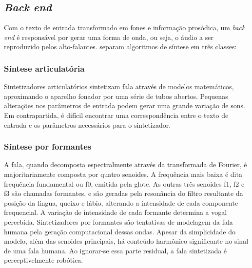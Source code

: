 
\subsection{\emph{Back end}}
\label{backend}
Com o texto de entrada transformado em fones e informação prosódica, um
\emph{back end} é responsável por gerar uma forma de onda, ou seja, o áudio a
ser reproduzido pelos alto-falantes.  separam
algoritmos de síntese em três classes:

\subsubsection{Síntese articulatória}
Sintetizadores articulatórios sintetizam fala através de modelos matemáticos,
aproximando o aparelho fonador por uma série de tubos abertos. Pequenas
alterações nos parâmetros de entrada podem gerar uma grande variação de sons. Em
contrapartida, é difícil encontrar uma correspondência entre o texto de entrada
e os parâmetros necessários para o sintetizador.

\subsubsection{Síntese por formantes}
A fala, quando decomposta espectralmente através da transformada de Fourier, é
majoritariamente composta por quatro senoides. A frequência mais baixa é dita
frequência fundamental ou f0, emitida pela glote. As outras três senoides f1, f2
e f3 são chamadas formantes, e são geradas pela resonância do filtro resultante
da posição da língua, queixo e lábio, alterando a intensidade de cada componente
frequencial. A variação de intensidade de cada formante determina a vogal
percebida. Sintetizadores por formantes são tentativas de modelagem da fala
humana pela geração computacional dessas ondas. Apesar da simplicidade do
modelo, além das senoides principais, há conteúdo harmônico significante no
sinal de uma fala humana. Ao ignorar-se essa parte residual, a fala sintetizada
é perceptivelmente robótica.

